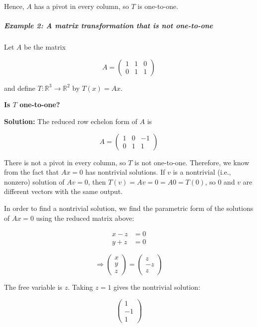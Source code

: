 \documentclass[a4paper,12pt]{article}
\begin{document}
Hence, \( A \) has a pivot in every column, so \( T \) is one-to-one.

\subparagraph{Example 2: A matrix transformation that is not one-to-one} Let \( A \) be the matrix

\[
A = \begin{pmatrix} 
1 & 1 & 0 \\
0 & 1 & 1
\end{pmatrix}
\]

and define \( T: \mathbb{R}^3 \to \mathbb{R}^2 \) by \( T(x) = Ax \).

\textbf{Is \( T \) one-to-one?} 

\textbf{Solution:}  
The reduced row echelon form of \( A \) is

\[
A = \begin{pmatrix} 
1 & 0 & -1 \\
0 & 1 & 1
\end{pmatrix}
\]

There is not a pivot in every column, so \( T \) is not one-to-one. Therefore, we know from the fact that \( Ax = 0 \) has nontrivial solutions. If \( v \) is a nontrivial (i.e., nonzero) solution of \( Av = 0 \), then \( T(v) = Av = 0 = A0 = T(0) \), so 0 and \( v \) are different vectors with the same output.

In order to find a nontrivial solution, we find the parametric form of the solutions of \( Ax = 0 \) using the reduced matrix above:

\[
\begin{aligned}
x - z &= 0 \\
y + z &= 0
\end{aligned}
\]

\[
\Rightarrow
\begin{pmatrix}
x \\
y \\
z
\end{pmatrix}
= 
\begin{pmatrix}
z \\
-z \\
z
\end{pmatrix}
\]

The free variable is \( z \). Taking \( z = 1 \) gives the nontrivial solution:

\[
\begin{pmatrix}
1 \\
-1 \\
1
\end{pmatrix}
\]
\end{document}
